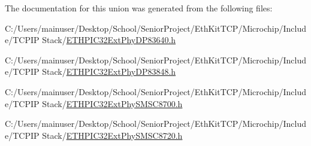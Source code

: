 The documentation for this union was generated from the following files\+:\begin{DoxyCompactItemize}
\item 
C\+:/\+Users/mainuser/\+Desktop/\+School/\+Senior\+Project/\+Eth\+Kit\+T\+C\+P/\+Microchip/\+Include/\+T\+C\+P\+I\+P Stack/\hyperlink{_e_t_h_p_i_c32_ext_phy_d_p83640_8h}{E\+T\+H\+P\+I\+C32\+Ext\+Phy\+D\+P83640.\+h}\item 
C\+:/\+Users/mainuser/\+Desktop/\+School/\+Senior\+Project/\+Eth\+Kit\+T\+C\+P/\+Microchip/\+Include/\+T\+C\+P\+I\+P Stack/\hyperlink{_e_t_h_p_i_c32_ext_phy_d_p83848_8h}{E\+T\+H\+P\+I\+C32\+Ext\+Phy\+D\+P83848.\+h}\item 
C\+:/\+Users/mainuser/\+Desktop/\+School/\+Senior\+Project/\+Eth\+Kit\+T\+C\+P/\+Microchip/\+Include/\+T\+C\+P\+I\+P Stack/\hyperlink{_e_t_h_p_i_c32_ext_phy_s_m_s_c8700_8h}{E\+T\+H\+P\+I\+C32\+Ext\+Phy\+S\+M\+S\+C8700.\+h}\item 
C\+:/\+Users/mainuser/\+Desktop/\+School/\+Senior\+Project/\+Eth\+Kit\+T\+C\+P/\+Microchip/\+Include/\+T\+C\+P\+I\+P Stack/\hyperlink{_e_t_h_p_i_c32_ext_phy_s_m_s_c8720_8h}{E\+T\+H\+P\+I\+C32\+Ext\+Phy\+S\+M\+S\+C8720.\+h}\end{DoxyCompactItemize}
